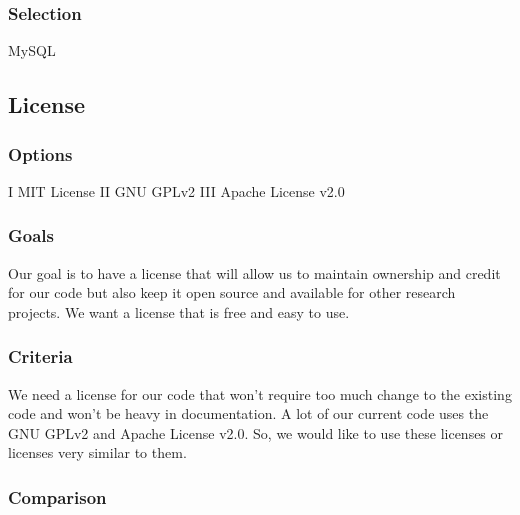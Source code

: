 \documentclass[10pt,draftclsnofoot,onecolumn,journal,compsoc]{IEEEtran}
\begin{document}
\subsubsection{Selection}

\noindent MySQL

\subsection{License}

\subsubsection{Options}

\noindent I MIT License \newline
\noindent II GNU GPLv2 \newline
\noindent III Apache License v2.0

\subsubsection{Goals}

\noindent Our goal is to have a license that will allow us to maintain ownership and credit for our code but also keep it open source and available for other research projects. We want a license that is free and easy to use.

\subsubsection{Criteria}

\noindent We need a license for our code that won't require too much change to the existing code and won't be heavy in documentation. A lot of our current code uses the GNU GPLv2 and Apache License v2.0. So, we would like to use these licenses or licenses very similar to them.

\subsubsection{Comparison}
\end{document}
